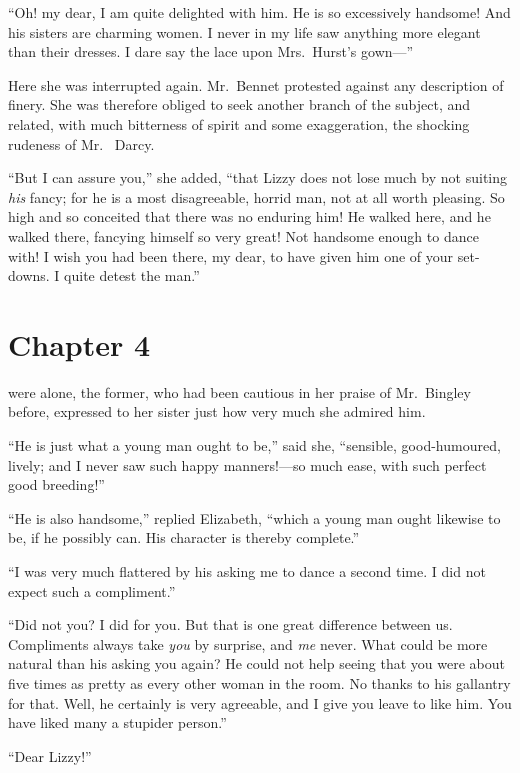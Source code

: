 ``Oh! my dear, I am quite delighted with him.  He is so
excessively handsome!  And his sisters are charming women.
I never in my life saw anything more elegant than their dresses.
I dare say the lace upon Mrs.\ Hurst's gown---''

Here she was interrupted again.  Mr.\ Bennet protested against
any description of finery.  She was therefore obliged to seek
another branch of the subject, and related, with much bitterness
of spirit and some exaggeration, the shocking rudeness of Mr.\ %
Darcy.

``But I can assure you,'' she added, ``that Lizzy does not lose
much by not suiting \emph{his} fancy; for he is a most disagreeable,
horrid man, not at all worth pleasing.  So high and so conceited
that there was no enduring him!  He walked here, and he walked
there, fancying himself so very great!  Not handsome enough to
dance with!  I wish you had been there, my dear, to have given
him one of your set-downs.  I quite detest the man.''



\chapter{Chapter 4}


 were alone, the former, who had been
cautious in her praise of Mr.\ Bingley before, expressed to her
sister just how very much she admired him.

``He is just what a young man ought to be,'' said she, ``sensible,
good-humoured, lively; and I never saw such happy manners!---so
much ease, with such perfect good breeding!''

``He is also handsome,'' replied Elizabeth, ``which a young man
ought likewise to be, if he possibly can.  His character is thereby
complete.''

``I was very much flattered by his asking me to dance a second
time.  I did not expect such a compliment.''

``Did not you? I did for you.  But that is one great difference
between us.  Compliments always take \emph{you} by surprise, and
\emph{me} never.  What could be more natural than his asking you
again?  He could not help seeing that you were about five times
as pretty as every other woman in the room.  No thanks to his
gallantry for that.  Well, he certainly is very agreeable, and I
give you leave to like him.  You have liked many a stupider
person.''

``Dear Lizzy!''

